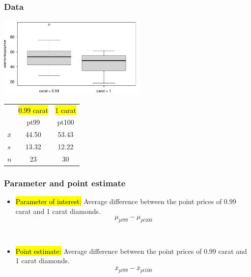 \documentclass[notes,11pt, aspectratio=169]{beamer}
\begin{document}

\begin{frame}[fragile]
\frametitle{Data}

\begin{center}
\includegraphics[width=0.55\textwidth]{graphs/diamondBox.pdf}
\end{center}

{\small
\begin{center}
\begin{tabular}{l | c | c}
		& {\footnotesize \hl{0.99 carat}} &  {\footnotesize \hl{1 carat}}  \\
		& pt99	& pt100 \\
\hline
$\bar{x}$	& 44.50		& 53.43 \\
$s$		& 13.32		& 12.22 \\
$n$		& 23			& 30
\end{tabular}
\end{center}
}


\end{frame}


\begin{frame}
\frametitle{Parameter and point estimate}

\begin{itemize}

\item \hl{Parameter of interest:} Average difference between the point prices of  0.99 carat and 1 carat diamonds.
\[ \mu_{pt99} - \mu_{pt100} \]

$\:$ \\

\pause

\item \hl{Point estimate:} Average difference between the point prices of   0.99 carat and 1 carat diamonds.
\[ \bar{x}_{pt99} - \bar{x}_{pt100} \]

\end{itemize}

\end{frame}
\end{document}
